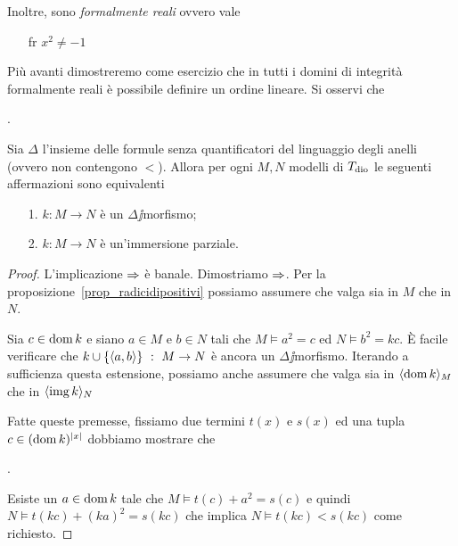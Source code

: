 Inoltre, sono \emph{formalmente reali\/} ovvero vale 

\begin{itemize}
\item[fr]  $x^2\neq -1$
\end{itemize}

Pi\`u avanti dimostreremo come esercizio che in tutti i domini di integrit\`a formalmente reali \`e possibile definire un ordine lineare. Si osservi che 

.

\begin{proposition}
Sia $\Delta$ l'insieme delle formule senza quantificatori del linguaggio degli anelli (ovvero non contengono $<$).  Allora per ogni $M,N$ modelli di $T_{\rm dio}$ le seguenti affermazioni sono equivalenti
\begin{itemize}
 \item[1.] $k:M\to N$ \`e un $\Delta\jj$morfismo;
 \item[2.] $k:M\to N$ \`e un'immersione parziale.
\end{itemize}
\end{proposition}
\begin{proof}
L'implicazione $\Rightarrow$ \`e banale. Dimostriamo $\Rightarrow$. Per la proposizione~\ref{prop_radicidipositivi} possiamo assumere che  valga sia in $M$ che in $N$. 

Sia $c\in\mathop{\rm dom} k$ e siano $a\in M$ e $b\in N$ tali che $M\models a^2=c$ ed  $N\models b^2=kc$. \`E facile verificare che $k\cup\{\langle a,b\rangle\}\ :\ M\to N$ \`e ancora un $\Delta\jj$morfismo. Iterando a sufficienza questa estensione, possiamo anche assumere che  valga sia in $\langle\mathop{\rm dom} k\rangle_M$ che in $\langle\mathop{\rm img} k\rangle_N$


Fatte queste premesse, fissiamo due termini $t(x)$ e $s(x)$ ed una tupla $c\in(\mathop{\rm dom} k)^{|x|}$ dobbiamo mostrare che 

.

Esiste un $a\in\mathop{\rm dom} k$ tale che $M\models t(c) + a^2= s(c)$ e quindi $N\models t(kc) + (ka)^2= s(kc)$ che implica $N\models t(kc)<s(kc)$ come richiesto.
\end{proof}


